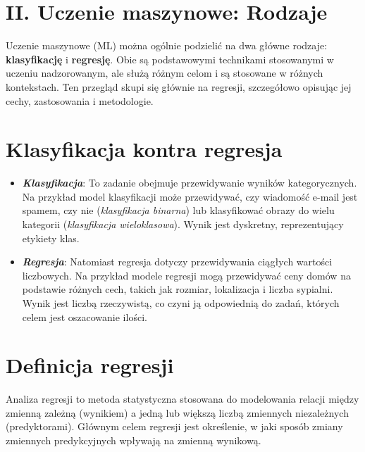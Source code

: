 {}
\justify
\fontsize{14}{16}\selectfont
\setlength{\parindent}{0pt}
\section*{II. Uczenie maszynowe: Rodzaje \cite{alma991000280759708832}}
\fontsize{12}{14}\selectfont
\vspace{-1.0em}

\hspace{1.5cm} Uczenie maszynowe (ML) można ogólnie podzielić na dwa główne rodzaje: \textbf{klasyfikację} i \textbf{regresję}. Obie są podstawowymi technikami stosowanymi w uczeniu nadzorowanym, ale służą różnym celom i są stosowane w różnych kontekstach. Ten przegląd skupi się głównie na regresji, szczegółowo opisując jej cechy, zastosowania i metodologie.

{}
\section*{Klasyfikacja kontra regresja}

\vspace{-1.0em}

\begin{itemize}
    \item \textbf{\textit{Klasyfikacja}}: To zadanie obejmuje przewidywanie wyników kategorycznych. Na przykład model klasyfikacji może przewidywać, czy wiadomość e-mail jest spamem, czy nie (\textit{klasyfikacja binarna}) lub klasyfikować obrazy do wielu kategorii (\textit{klasyfikacja wieloklasowa}). Wynik jest dyskretny, reprezentujący etykiety klas.
    \item \textit{\textbf{Regresja}}: Natomiast regresja dotyczy przewidywania ciągłych wartości liczbowych. Na przykład modele regresji mogą przewidywać ceny domów na podstawie różnych cech, takich jak rozmiar, lokalizacja i liczba sypialni. Wynik jest liczbą rzeczywistą, co czyni ją odpowiednią do zadań, których celem jest oszacowanie ilości.
\end{itemize}

\section*{Definicja regresji}

\vspace{-1.0em}

\hspace{1.5cm} Analiza regresji to metoda statystyczna stosowana do modelowania relacji między zmienną zależną (wynikiem) a jedną lub większą liczbą zmiennych niezależnych (predyktorami). Głównym celem regresji jest określenie, w jaki sposób zmiany zmiennych predykcyjnych wpływają na zmienną wynikową.

